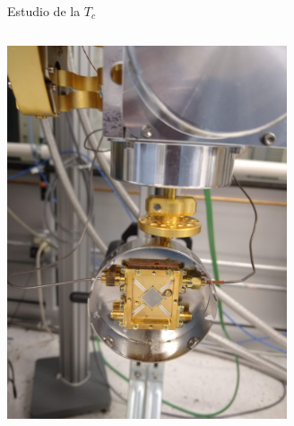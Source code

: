 \documentclass[ignorenonframetext,12pt]{beamer}
\begin{document}
\begin{frame}{Estudio de la $T_c$}
\begin{columns}
\begin{column}{0.49\textwidth}
												\includegraphics[angle=-90,width=0.62\textwidth]{mkid2}
								\end{column}
				\end{columns}
\end{frame}
\end{document}
